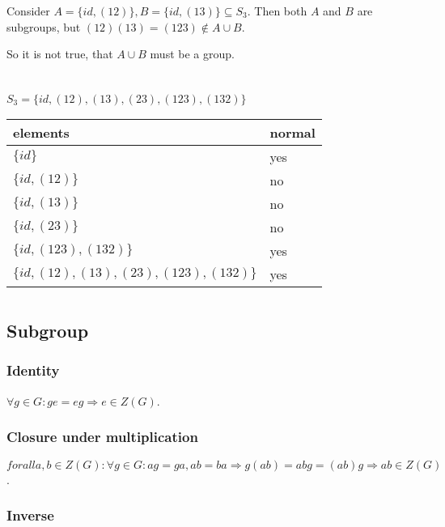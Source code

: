 \documentclass[a4paper]{article}
\begin{document}
Consider $A = \{id, (12)\}, B = \{id, (13)\} \subseteq S_3$. Then both $A$ and $B$ are subgroups, but $(12)(13) = (123) \notin A \cup B$.

So it is not true, that $A \cup B$ must be a group.

\section{}

$S_3 = \{id, (12), (13), (23), (123), (132) \}$

\begin{tabular}{ | l | l |}
	\hline
	elements & normal \\
	\hline
	$\{id\}$ & yes \\
	\hline
	$\{id, (12)\}$ & no \\
	\hline
	$\{id, (13)\}$ & no \\
	\hline
	$\{id, (23)\}$ & no \\
	\hline
	$\{id, (123), (132)\}$ & yes \\
	\hline
	$\{id, (12), (13), (23), (123), (132)\}$ & yes \\
	\hline
\end{tabular}

\section{}

\subsection*{Subgroup}

\subsubsection*{Identity}

$\forall g \in G: ge = eg \Rightarrow e \in Z(G)$.

\subsubsection*{Closure under multiplication}
$forall a, b \in Z(G): \forall g \in G: ag = ga, ab = ba \Rightarrow g(ab) = abg = (ab)g \Rightarrow ab \in Z(G)$.

\subsubsection*{Inverse}
\end{document}
